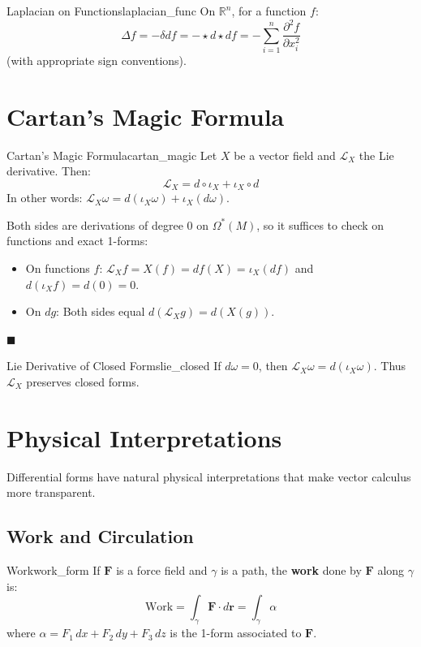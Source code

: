 \documentclass[11pt, letterpaper, openany]{book}
\renewenvironment{proof}[1][\proofname]{%
  \tcolorbox[blanker, breakable, left=1em,
    before skip=1em, after skip=1em,
    borderline west={2pt}{0pt}{MagicTeal!50},
    colback=MagicCream,
    before upper={\textcolor{MagicTeal}{\sffamily\bfseries #1.}\space}
  ]%
}{%
  \hfill\textcolor{MagicTeal}{\ensuremath{\blacksquare}}\endtcolorbox%
}
\begin{document}
\begin{thm}{Laplacian on Functions}{laplacian_func}
On $\mathbb{R}^n$, for a function $f$:
\[\Delta f = -\delta df = -\star d \star df = -\sum_{i=1}^n \frac{\partial^2 f}{\partial x_i^2}\]
(with appropriate sign conventions).
\end{thm}

\section{Cartan's Magic Formula}

\begin{thm}{Cartan's Magic Formula}{cartan_magic}
Let $X$ be a vector field and $\mathcal{L}_X$ the Lie derivative. Then:
\[\mathcal{L}_X = d \circ \iota_X + \iota_X \circ d\]
In other words: $\mathcal{L}_X \omega = d(\iota_X \omega) + \iota_X(d\omega)$.
\end{thm}

\begin{proof}[Sketch]
Both sides are derivations of degree 0 on $\Omega^*(M)$, so it suffices to check on functions and exact 1-forms:
\begin{itemize}
    \item On functions $f$: $\mathcal{L}_X f = X(f) = df(X) = \iota_X(df)$ and $d(\iota_X f) = d(0) = 0$.
    \item On $dg$: Both sides equal $d(\mathcal{L}_X g) = d(X(g))$.
\end{itemize}
\end{proof}

\begin{cor}{Lie Derivative of Closed Forms}{lie_closed}
If $d\omega = 0$, then $\mathcal{L}_X \omega = d(\iota_X \omega)$. Thus $\mathcal{L}_X$ preserves closed forms.
\end{cor}

\section{Physical Interpretations}

Differential forms have natural physical interpretations that make vector calculus more transparent.

\subsection{Work and Circulation}

\begin{defn}{Work}{work_form}
If $\mathbf{F}$ is a force field and $\gamma$ is a path, the \textbf{work} done by $\mathbf{F}$ along $\gamma$ is:
\[\text{Work} = \int_\gamma \mathbf{F} \cdot d\mathbf{r} = \int_\gamma \alpha\]
where $\alpha = F_1\,dx + F_2\,dy + F_3\,dz$ is the 1-form associated to $\mathbf{F}$.
\end{defn}
\end{document}
